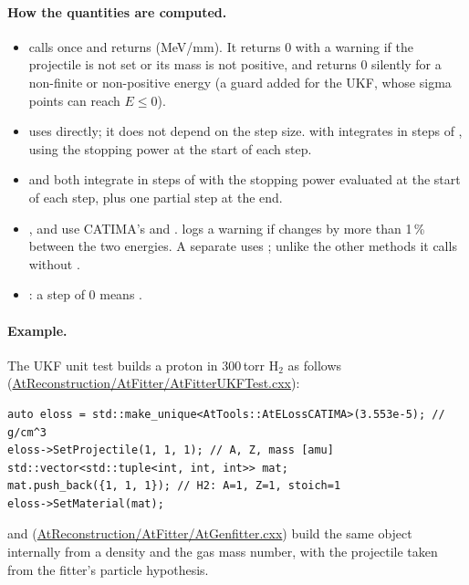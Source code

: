 \paragraph{How the quantities are computed.}
\begin{itemize}
\item {} calls  once and returns  (MeV/mm). It
  returns 0 with a warning if the projectile is not set or its mass is not positive, and returns 0 silently for a
  non-finite or non-positive energy (a guard added for the UKF, whose sigma points can reach $E\le 0$).
\item {} uses  directly; it does not depend on the step size.
   with  integrates in steps of , using the stopping
  power at the start of each step.
\item {} and  both integrate in steps of  with
  the stopping power evaluated at the start of each step, plus one partial step at the end.
\item {},  and  use CATIMA's
   and .  logs a warning if \dedx{}
  changes by more than 1\,\% between the two energies. A separate  uses
  ; unlike the other methods it calls  without .
\item {}: a step of 0 means .
\end{itemize}

\paragraph{Example.}
The UKF unit test builds a proton in 300\,torr H$_2$ as follows
(\url{AtReconstruction/AtFitter/AtFitterUKFTest.cxx}):
\begin{verbatim}
auto eloss = std::make_unique<AtTools::AtELossCATIMA>(3.553e-5); // g/cm^3
eloss->SetProjectile(1, 1, 1); // A, Z, mass [amu]
std::vector<std::tuple<int, int, int>> mat;
mat.push_back({1, 1, 1}); // H2: A=1, Z=1, stoich=1
eloss->SetMaterial(mat);
\end{verbatim}
 and 
(\url{AtReconstruction/AtFitter/AtGenfitter.cxx}) build the same object internally from a density and the gas mass
number, with the projectile taken from the fitter's particle hypothesis.

